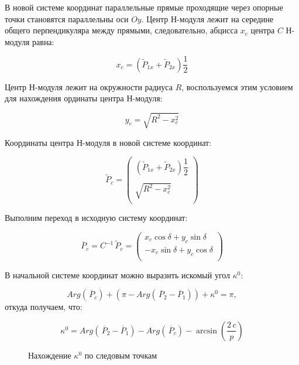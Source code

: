 В новой системе координат параллельные прямые проходящие через опорные точки становятся параллельны оси $Oy$. Центр Н-модуля лежит на середине общего перпендикуляра между прямыми, следовательно, абцисса $x_c$ центра $C$ Н-модуля равна:

$$
x_c = \left(\tilde{P}_{1x}+\tilde{P}_{2x}\right)\dfrac{1}{2}
$$

Центр Н-модуля лежит на окружности радиуса $R$, воспользуемся этим условием для нахождения ординаты центра Н-модуля:

$$
y_c = \sqrt{R^2-x^2_c}
$$

Координаты центра Н-модуля в новой системе координат:

$$
\tilde{P}_c = \left( \begin{array}{ccc}
\left(\tilde{P}_{1x}+\tilde{P}_{2x}\right)\dfrac{1}{2}\\
\\
\sqrt{R^2-x^2_c}\\
\end{array}\right)
$$

Выполним переход в исходную систему координат:

$$
\overline{P}_c = C^{-1}\,\tilde{P}_c = \left( \begin{array}{ccc}
x_c\cos{\delta}+y_c\sin{\delta}\\
-x_c\sin{\delta}+y_c\cos{\delta}\\
\end{array}\right)
$$

В начальной системе координат можно выразить искомый угол $\kappa^0$:

$$
Arg(\,\overline{P}_c)+(\pi-Arg(\,\overline{P}_2-\overline{P}_1))+\kappa^0 = \pi,
$$
откуда получаем, что:

\begin{equation}
\kappa^0 = Arg(\,\overline{P}_2-\overline{P}_1)-Arg(\,\overline{P}_c)-\arcsin\left(\dfrac{2\,c}{p}\right)
\end{equation}


\begin{figure}
\caption{Нахождение $\kappa^0$ по следовым точкам}
\end{figure}




